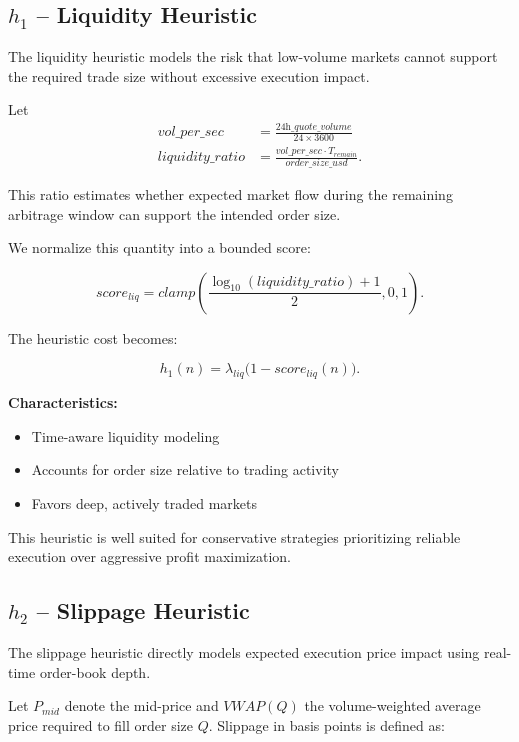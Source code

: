 \subsection{$h_1$ -- Liquidity Heuristic}

The liquidity heuristic models the risk that low-volume markets cannot support the required trade size without excessive execution impact.

Let
\begin{align}
\textit{vol\_per\_sec}
&=
\frac{\textit{24h\_quote\_volume}}{24 \times 3600}
\\
\textit{liquidity\_ratio}
&=
\frac{\textit{vol\_per\_sec} \cdot T_{\textit{remain}}}
{\textit{order\_size\_usd}}.
\end{align}

This ratio estimates whether expected market flow during the remaining arbitrage window can support the intended order size.

We normalize this quantity into a bounded score:

\[
\textit{score}_{liq} =
\textit{clamp}\!\left(
\frac{\log_{10}(\textit{liquidity\_ratio}) + 1}{2},
0,
1
\right).
\]

The heuristic cost becomes:

\[
h_1(n) = \lambda_{liq} \big(1 - \textit{score}_{liq}(n)\big).
\]

\textbf{Characteristics:}
\begin{itemize}
    \item Time-aware liquidity modeling
    \item Accounts for order size relative to trading activity
    \item Favors deep, actively traded markets
\end{itemize}

This heuristic is well suited for conservative strategies prioritizing reliable execution over aggressive profit maximization.

\subsection{$h_2$ -- Slippage Heuristic}

The slippage heuristic directly models expected execution price impact using real-time order-book depth.

Let $P_{mid}$ denote the mid-price and $\textit{VWAP}(Q)$ the volume-weighted average price required to fill order size $Q$. Slippage in basis points is defined as:

